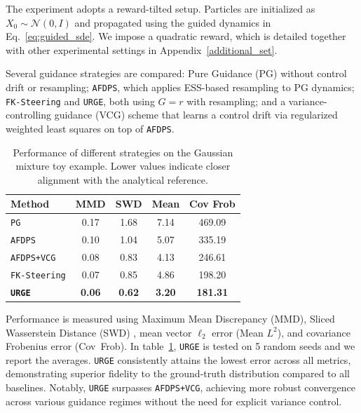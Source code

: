 \documentclass{article}
\theoremstyle{plain}
\theoremstyle{definition}
\theoremstyle{remark}
\begin{document}
The experiment adopts a reward-tilted setup. Particles are initialized as \(X_0\sim\mathcal{N}(0,I)\) and propagated using the guided dynamics in Eq.~\eqref{eq:guided_sde}. We impose a quadratic reward, which is detailed together with other experimental settings in Appendix~\ref{additional_set}.

Several guidance strategies are compared: Pure Guidance (PG) without control drift or resampling; \texttt{AFDPS}, which applies ESS-based resampling to PG dynamics; \texttt{FK-Steering} and \texttt{URGE}, both using \(G=r\) with resampling; and a variance-controlling guidance (VCG) \cite{ren2025driftlite} scheme that learns a control drift via regularized weighted least squares on top of \texttt{AFDPS}. 

\begin{table}[!t]
    \centering
    \begin{tabular}{l c c c c}
    \toprule
    \textbf{Method}              & \textbf{MMD}& \textbf{SWD}  & \textbf{Mean}  & \textbf{Cov Frob} \\
    \midrule
    \texttt{PG}                  & 0.17 & 1.68 & 7.14 & 469.09 \\
    \texttt{AFDPS}               & 0.10 & 1.04 & 5.07 & 335.19 \\
    \texttt{AFDPS+VCG}           & 0.08 & 0.83 & 4.13 & 246.61 \\
    \texttt{FK-Steering}         & 0.07 & 0.85 & 4.86 & 198.20 \\
    \texttt{\bfseries URGE}      & \textbf{0.06} & \textbf{0.62} & \textbf{3.20} & \textbf{181.31} \\
    \bottomrule
    \end{tabular}
    \caption{Performance of different strategies on the Gaussian mixture toy example. Lower values indicate closer alignment with the analytical reference.}
    \label{tab:gmm_results}
    \vspace{-0.2in}
\end{table}


Performance is measured using Maximum Mean Discrepancy (MMD)\cite{smola2006maximum}, Sliced Wasserstein Distance (SWD) \cite{bonneel2015sliced}, mean vector \(\ell_2\) error (Mean $L^2$), and covariance Frobenius error (Cov~Frob). In table~\ref{tab:gmm_results}, \texttt{URGE} is tested on 5 random seeds and we report the averages. \texttt{URGE} consistently attains the lowest error across all metrics, demonstrating superior fidelity to the ground-truth distribution compared to all baselines. Notably, \texttt{URGE} surpasses \texttt{AFDPS+VCG}, achieving more robust convergence across various guidance regimes without the need for explicit variance control.
\end{document}
